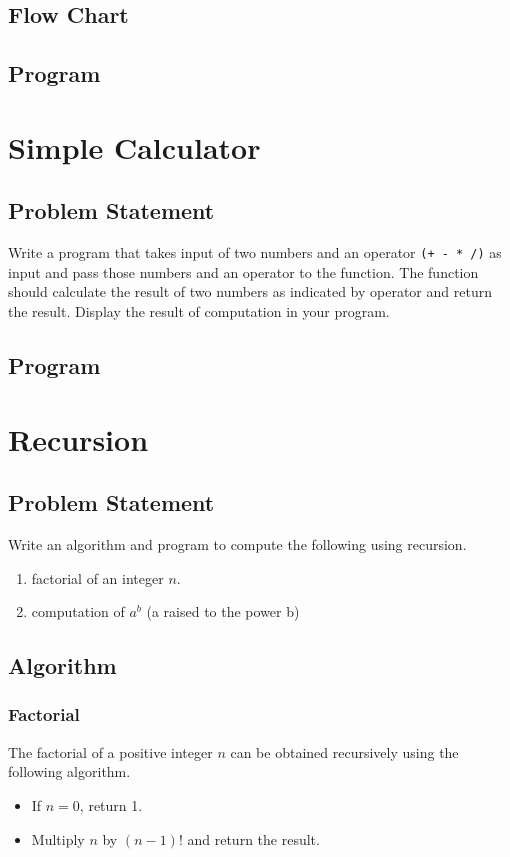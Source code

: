 \documentclass[11pt]{report}
\begin{document}
\section{Flow Chart}
\leavevmode\newpage
\leavevmode\newpage
\section{Program}



\chapter{Simple Calculator}
\section{Problem Statement}
Write a program that takes input of two numbers and an operator \texttt{(+ - * /)} as input and pass those numbers and an operator to the function. The function should calculate the result of two numbers as indicated by operator and return the result. Display the result of computation in your program.
\section{Program}



\chapter{Recursion}
\section{Problem Statement}
Write an algorithm and program to compute the following using recursion.
\begin{enumerate}
  \item factorial of an integer $n$.
  \item computation of $a^b$ (a raised to the power b)
\end{enumerate}
\section{Algorithm}
\subsection{Factorial}
The factorial of a positive integer $n$ can be obtained recursively using the following algorithm.
\begin{itemize}
\item If $n=0$, return 1.
\item Multiply $n$ by $(n-1)!$ and return the result. 
\end{itemize}
\end{document}
